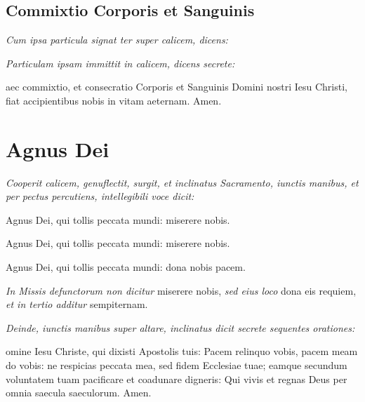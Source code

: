 
\subsection{Commixtio Corporis et Sanguinis}

\textit{Cum ipsa particula signat ter super calicem, dicens:}


\textit{Particulam ipsam immittit in calicem, dicens secrete:}

aec commixtio, et consecratio Corporis et Sanguinis Domini nostri
Iesu Christi, fiat accipientibus nobis in vitam aeternam.  Amen.

\section{Agnus Dei}


\textit{%
    Cooperit calicem, genuflectit, surgit, et inclinatus Sacramento, iunctis
    manibus, et per pectus percutiens, intellegibili voce dicit:
}

{
    \Large\centering
    \par Agnus Dei, qui tollis peccata mundi: miserere nobis.
    \par Agnus Dei, qui tollis peccata mundi: miserere nobis.
    \par Agnus Dei, qui tollis peccata mundi: dona nobis pacem.
    \par
}

\divisio

\textit{In Missis defunctorum non dicitur} miserere nobis, \textit{sed eius
loco} dona eis requiem, \textit{et in tertio additur} sempiternam.

\divisio

\textit{%
    Deinde, iunctis manibus super altare, inclinatus dicit secrete sequentes
    orationes:
}

omine Iesu Christe, qui dixisti Apostolis tuis: Pacem relinquo
vobis, pacem meam do vobis: ne respicias peccata mea, sed fidem Ecclesiae tuae;
eamque secundum voluntatem tuam pacificare et coadunare digneris: Qui vivis et
regnas Deus per omnia saecula saeculorum.  Amen.

